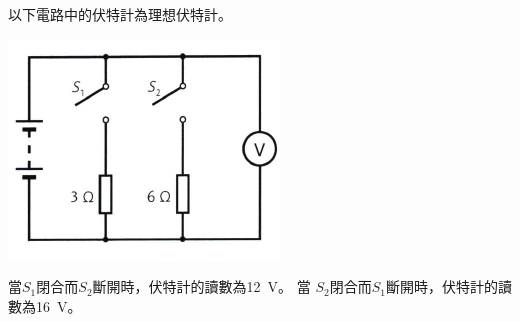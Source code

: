 {
    以下電路中的伏特計為理想伏特計。
    \par{\par\centering\includegraphics[width=.35\textwidth]{./img/ch2_circuit_lq_2024-06-14-14-23-50.png}\par}
    當$S_1$閉合而$S_2$斷開時，伏特計的讀數為\qty{12}{V}。 當 $S_2$閉合而$S_1$斷開時，伏特計的讀數為\qty{16}{V}。

}{}